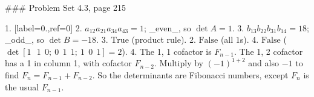### Problem Set 4.3, page 215

1. [label=0.,ref=0]
2. \(a_{12}a_{21}a_{34}a_{43}=1\); _even_, so \(\det A=1\). 3. \(b_{13}b_{22}b_{31}b_{14}=18\); _odd_, so \(\det B=-18\).
3. \(\mathrm{True}\) (product rule). 2. \(\mathrm{False}\) (all \(1\)s). 4. \(\mathrm{False}\) (\(\det[1\ \ \ 1\ \ 0;\ 0\ \ 1\ \ 1;\ 1\ \ 0\ \ 1]=2\)).
4. The 1, 1 cofactor is \(F_{n-1}\). The 1, 2 cofactor has a 1 in column 1, with cofactor \(F_{n-2}\). Multiply by \((-1)^{1+2}\) and also \(-1\) to find \(F_{n}=F_{n-1}+F_{n-2}\). So the determinants are Fibonacci numbers, except \(F_{n}\) is the usual \(F_{n-1}\).

 